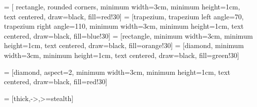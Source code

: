\usepackage{tikz}
\usetikzlibrary{shapes.geometric, arrows}
 = [
    rectangle, 
    rounded corners, 
    minimum width=3cm, 
    minimum height=1cm,
    text centered, 
    draw=black, 
    fill=red!30]
 = [trapezium,
    trapezium left angle=70,
    trapezium right angle=110,
    minimum width=3cm,
    minimum height=1cm,
    text centered,
    draw=black,
    fill=blue!30]
 = [rectangle,
    minimum width=3cm,
    minimum height=1cm,
    text centered,
    draw=black,
    fill=orange!30]
 = [diamond,
    minimum width=3cm,
    minimum height=1cm,
    text centered,
    draw=black,
    fill=green!30]

 = [diamond,
    aspect=2,
    minimum width=3cm,
    minimum height=1cm,
    text centered,
    draw=black,
    fill=red!30]

 = [thick,->,>=stealth]